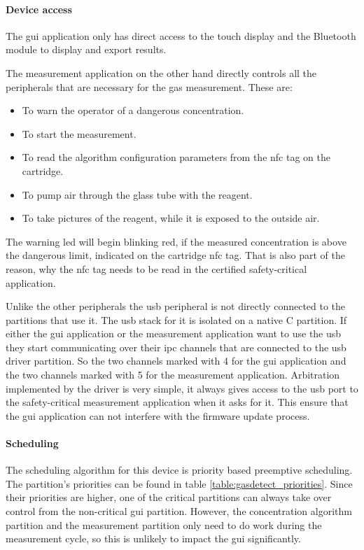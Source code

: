 \paragraph{Device access}
The \acrshort{gui} application only has direct access to the touch display and the Bluetooth module to display and export results.

The measurement application on the other hand directly controls all the peripherals that are necessary for the gas measurement. These are:
\begin{itemize}
    \item {} To warn the operator of a dangerous concentration.
    \item {} To start the measurement.
    \item {} To read the algorithm configuration parameters from the \acrshort{nfc} tag on the cartridge.
    \item {} To pump air through the glass tube with the reagent.
    \item {} To take pictures of the reagent, while it is exposed to the outside air.
\end{itemize}
The warning \acrshort{led} will begin blinking red, if the measured concentration is above the dangerous limit, indicated on the cartridge \acrshort{nfc} tag. That is also part of the reason, why the \acrshort{nfc} tag needs to be read in the certified safety-critical application.

Unlike the other peripherals the \acrshort{usb} peripheral is not directly connected to the partitions that use it. The \acrshort{usb} stack for it is isolated on a native C partition. If either the \acrshort{gui} application or the measurement application want to use the \acrshort{usb} they start communicating over their \acrshort{ipc} channels that are connected to the \acrshort{usb} driver partition. So the two channels marked with 4 for the \acrshort{gui} application and the two channels marked with 5 for the measurement application. Arbitration implemented by the driver is very simple, it always gives access to the \acrshort{usb} port to the safety-critical measurement application when it asks for it. This ensure that the \acrshort{gui} application can not interfere with the firmware update process. 

\paragraph{Scheduling}
The scheduling algorithm for this device is priority based preemptive scheduling. The partition's priorities can be found in table \ref{table:gasdetect_priorities}. Since their priorities are higher, one of the critical partitions can always take over control from the non-critical \acrshort{gui} partition. However, the concentration algorithm partition and the measurement partition only need to do work during the measurement cycle, so this is unlikely to impact the \acrshort{gui} significantly. 

